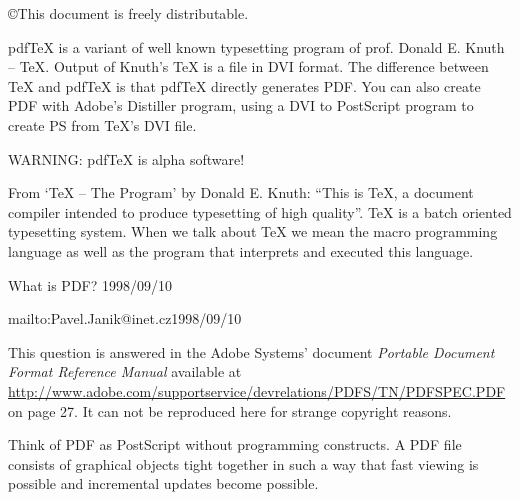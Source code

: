 \documentclass[11pt]{article}
\begin{document}
\copyright{This document is freely distributable.}

\tableofcontents




{

  pdfTeX is a variant of well known typesetting program of prof.
  Donald E.  Knuth -- TeX.  Output of Knuth's TeX is a file in DVI
  format. The difference between TeX and pdfTeX is that pdfTeX
  directly generates PDF. You can also create PDF with Adobe's
  Distiller program, using a DVI to PostScript program to create PS
  from TeX's DVI file.

  WARNING: pdfTeX is alpha software!  }



{  From `TeX -- The
Program' by Donald E. Knuth: ``This is TeX, a document compiler
intended to produce typesetting of high quality''. TeX is a batch
oriented typesetting system. When we talk about TeX we mean the
macro programming language as well as the program that interprets
and executed this language.  }


 { What is PDF?  }{1998/09/10}

{ 
  {mailto:Pavel.Janik@inet.cz}{1998/09/10}

  This question is answered
  in the Adobe Systems' document \emph{Portable Document Format
    Reference Manual} available at
  \url{http://www.adobe.com/supportservice/devrelations/PDFS/TN/PDFSPEC.PDF}
  on page 27. It can not be reproduced here for strange copyright
  reasons.

  Think of PDF as PostScript without programming constructs. A PDF
  file consists of graphical objects tight together in such a way that
  fast viewing is possible and incremental updates become possible.  }


\end{document}
